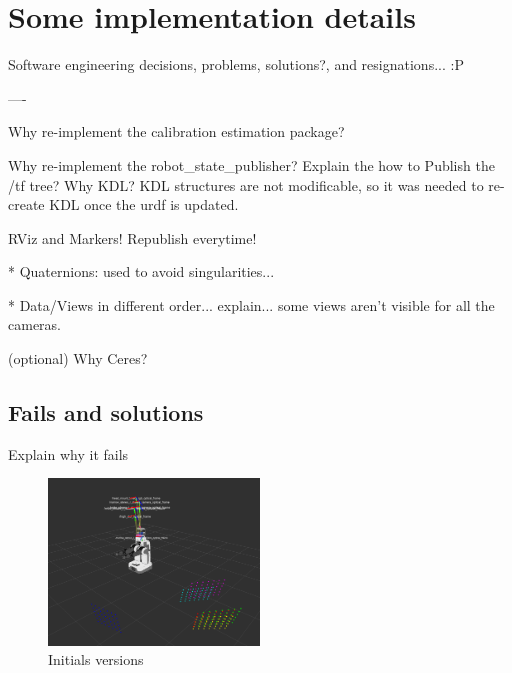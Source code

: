 \chapter{Some implementation details}
\label{cha:implementation}

Software engineering decisions, problems, solutions?, and resignations... :P


----

Why re-implement the calibration estimation package?

Why re-implement the robot\_state\_publisher? Explain the how to Publish the /tf tree?
Why KDL? KDL structures are not modificable, so it was needed to re-create KDL once the urdf is updated.

RViz and Markers! Republish everytime!

* Quaternions: used to avoid singularities...

* Data/Views in different order... explain... some views aren't visible for all the cameras.

(optional)
Why Ceres?


\section{Fails and solutions}

Explain why it fails
\begin{figure}[!htbp]
 \centering
 \includegraphics[width=0.5\textwidth]{images/screenshots/optimization_failer02_2.png}
 \caption{Initials versions}
 \label{fig:optimization_failer}
\end{figure}



